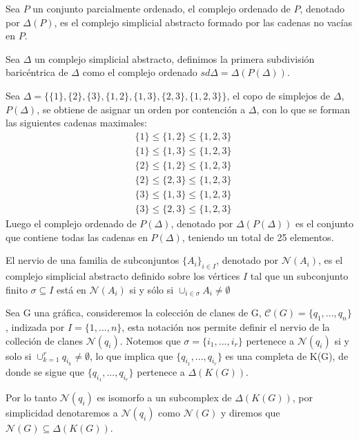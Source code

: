 \begin{Defi}
Sea $P$ un conjunto parcialmente ordenado, el complejo ordenado de $P$, denotado por $\Delta(P)$, es el complejo simplicial abstracto formado por las cadenas no vacías en $P$.
\end{Defi}
\begin{Defi}
Sea $\Delta$ un complejo simplicial abstracto, definimos la primera subdivisión baricéntrica de $\Delta$ como el complejo ordenado $sd\Delta = \Delta(P(\Delta))$.
\end{Defi}
\begin{Ejem}
Sea $\Delta = \{\{1\},\{2\},\{3\},\{1,2\},\{1,3\},\{2,3\},\{1,2,3\}\}$, el copo de simplejos de $\Delta$, $P(\Delta)$, se obtiene de asignar un orden por contención a $\Delta$, con lo que se forman las siguientes cadenas maximales:
\begin{align*}
&\{1\}\leq\{1,2\}\leq\{1,2,3\}\\
&\{1\}\leq\{1,3\}\leq\{1,2,3\}\\
&\{2\}\leq\{1,2\}\leq\{1,2,3\}\\
&\{2\}\leq\{2,3\}\leq\{1,2,3\}\\
&\{3\}\leq\{1,3\}\leq\{1,2,3\}\\
&\{3\}\leq\{2,3\}\leq\{1,2,3\}
\end{align*}
Luego el complejo ordenado de $P(\Delta)$, denotado por $\Delta(P(\Delta))$ es el conjunto que contiene todas las cadenas en $P(\Delta)$, teniendo un total de 25 elementos.
\end{Ejem}

\begin{Defi} 
El nervio de una familia de subconjuntos ${\{A_i\}}_{i\in I}$, denotado por $\mathcal{N}(A_i)$, es el complejo simplicial abstracto definido sobre los vértices $I$ tal que un subconjunto finito $\sigma \subseteq I$ está en $\mathcal{N}(A_i)$ si y sólo si ${\cup}_{i\in \sigma}A_i \neq \emptyset$
\end{Defi}
\begin{Ejem}
Sea G una gráfica, consideremos la colección de clanes de G, $\mathcal{C}(G) = \{q_1,...,q_n\}$, indizada por $I =\{1,...,n\}$, esta notación nos permite definir el nervio de la colleción de clanes $\mathcal{N}(q_i)$. Notemos que $\sigma = \{i_1,...,i_r\}$ pertenece a $\mathcal{N}(q_i)$ si y solo si $\cup_{k=1}^{r}q_{i_k}\neq\emptyset$, lo que implica que $\{q_{i_1},...,q_{i_r}\}$ es una completa de K(G), de donde se sigue que $\{q_{i_1},...,q_{i_r}\}$ pertenece a $\Delta(K(G))$.

Por lo tanto $\mathcal{N}(q_i)$ es isomorfo a un subcomplex de $\Delta(K(G))$, por simplicidad denotaremos a $\mathcal{N}(q_i)$ como $\mathcal{N}(G)$ y diremos que $\mathcal{N}(G)\subseteq \Delta(K(G))$.
\end{Ejem}

